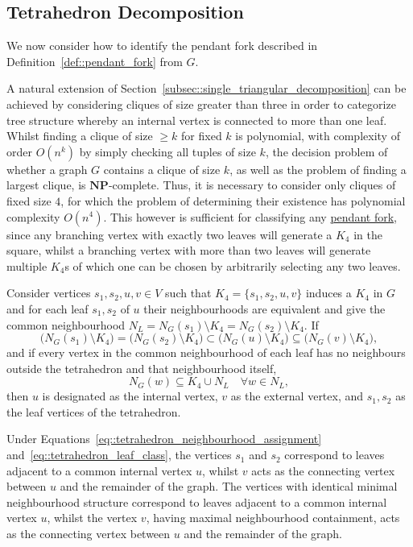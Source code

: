 \documentclass[11pt]{report}
\begin{document}
\subsection{Tetrahedron Decomposition} \label{subsec::tetrahedron_decomposition}
We now consider how to identify the pendant fork described in Definition~\ref{def::pendant_fork} from $G$. 

A natural extension of Section~\ref{subsec::single_triangular_decomposition} can be achieved by considering cliques of size greater than three in order to categorize tree structure whereby an internal vertex is connected to more than one leaf. Whilst finding a clique of size $\geq k$ for fixed $k$ is polynomial, with complexity of order $O(n^k)$ by simply checking all tuples of size $k$, the decision problem of whether a graph $G$ contains a clique of size $k$, as well as the problem of finding a largest clique, is $\mathbf{NP}$-complete. Thus, it is necessary to consider only cliques of fixed size $4$, for which the problem of determining their existence has polynomial complexity $O(n^4)$. This however is sufficient for classifying any \hyperref[def::pendant_fork]{pendant fork}, since any branching vertex with exactly two leaves will generate a $K_4$ in the square, whilst a branching vertex with more than two leaves will generate multiple $K_4$s of which one can be chosen by arbitrarily selecting any two leaves.

Consider vertices $s_1,s_2,u,v\in V$ such that $K_4 = \{s_1,s_2,u,v\}$ induces a $K_4$ in $G$ and for each leaf $s_1, s_2$ of $u$ their neighbourhoods are equivalent and give the common neighbourhood $N_L = N_G(s_1)\setminus K_4 =N_G(s_2) \setminus K_4$. If
\begin{equation} \label{eq::tetrahedron_neighbourhood_assignment}
  \big( N_G(s_1)\setminus K_4 \big) = \big( N_G(s_2)\setminus K_4 \big) \subset \big( N_G(u)\setminus K_4 \big) \subseteq \big( N_G(v)\setminus K_4 \big),
\end{equation}
and if every vertex in the common neighbourhood of each leaf has no neighbours outside the tetrahedron and that neighbourhood itself,
\begin{equation} \label{eq::tetrahedron_leaf_class}
  N_G(w) \subseteq K_4 \cup N_L \quad \forall w\in N_L,
\end{equation}
then $u$ is designated as the internal vertex, $v$ as the external vertex, and $s_1,s_2$ as the leaf vertices of the tetrahedron.

Under Equations~\eqref{eq::tetrahedron_neighbourhood_assignment} and~\eqref{eq::tetrahedron_leaf_class}, the vertices $s_1$ and $s_2$ correspond to leaves adjacent to a common internal vertex $u$, whilst $v$ acts as the connecting vertex between $u$ and the remainder of the graph. The vertices with identical minimal neighbourhood structure correspond to leaves adjacent to a common internal vertex $u$, whilst the vertex $v$, having maximal neighbourhood containment, acts as the connecting vertex between $u$ and the remainder of the graph.
\end{document}
